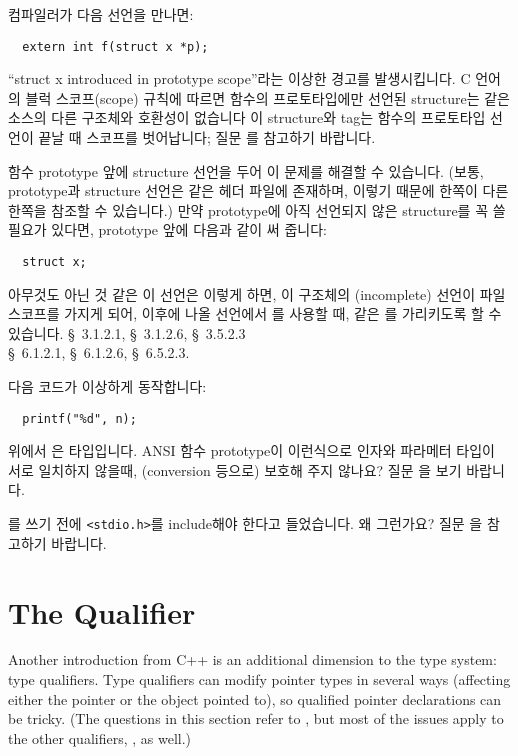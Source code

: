 \begin{faq}
	컴파일러가 다음 선언을 만나면:
\begin{verbatim}
  extern int f(struct x *p);
\end{verbatim}
	``struct x introduced in prototype scope''라는 이상한 경고를
	발생시킵니다.
\A
	C 언어의 블럭 스코프(scope) 규칙에 따르면 함수의 프로토타입에만
	선언된 structure는 같은 소스의 다른 구조체와 호환성이 없습니다
	이 structure와 tag는 함수의 프로토타입 선언이 끝날 때 스코프를
        벗어납니다; 질문 를 참고하기 바랍니다.

	함수 prototype 앞에 structure 선언을 두어 이 문제를 해결할 수 있습니다.
        (보통, prototype과 structure 선언은 같은 헤더 파일에 존재하며, 
        이렇기 때문에 한쪽이 다른 한쪽을 참조할 수 있습니다.)
        만약 prototype에 아직 선언되지 않은 structure를 꼭 쓸 필요가 있다면,
        prototype 앞에 다음과 같이 써 줍니다:
\begin{verbatim}
  struct x;
\end{verbatim}
	\noindent 아무것도 아닌 것 같은 이 선언은 
	\noindent 이렇게 하면, 이 구조체의 (incomplete) 선언이 파일
        스코프를 가지게 되어,
	이후에 나올 선언에서 를 사용할 때, 같은 를
	가리키도록 할 수 있습니다.
\R
	\cite{ansi} \S\ 3.1.2.1, \S\ 3.1.2.6, \S\ 3.5.2.3 \\
	\cite{c89} \S\ 6.1.2.1, \S\ 6.1.2.6, \S\ 6.5.2.3.
\end{faq}


\begin{faq}
	다음 코드가 이상하게 동작합니다:
\begin{verbatim}
  printf("%d", n);
\end{verbatim}
	위에서 은  타입입니다. ANSI 함수 prototype이
        이런식으로 인자와 파라메터 타입이 서로 일치하지 않을때, (conversion
        등으로) 보호해 주지 않나요?
\A
	질문 을 보기 바랍니다.
\end{faq}


\begin{faq}
	를 쓰기 전에 \verb+<stdio.h>+를 include해야 한다고
        들었습니다. 왜 그런가요?
\A
	질문 을 참고하기 바랍니다.
\end{faq}

\section{The  Qualifier}
Another introduction from C++ is an additional dimension to the type
system: type qualifiers.  Type qualifiers can modify pointer types in several
ways (affecting either the pointer or the object pointed to), so qualified
pointer declarations can be tricky. (The questions in this section refer to
, but most of the issues apply to the other qualifiers,
, as well.)


